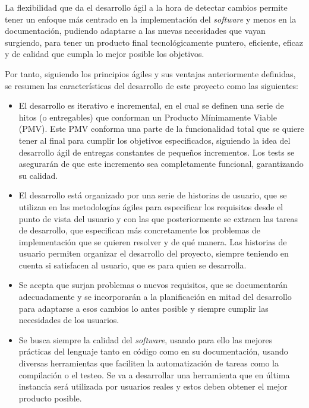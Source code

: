 La flexibilidad que da el desarrollo ágil a la hora de detectar cambios permite
tener un enfoque más centrado en la implementación del \textit{software} y menos
en la documentación, pudiendo adaptarse a las nuevas necesidades que vayan
surgiendo, para tener un producto final tecnológicamente puntero, eficiente,
eficaz y de calidad que cumpla lo mejor posible los objetivos.

Por tanto, siguiendo los principios ágiles y sus ventajas anteriormente
definidas, se resumen las características del desarrollo de este proyecto como
las siguientes:

\begin{itemize}
    \item El desarrollo es iterativo e incremental, en el cual se definen una
    serie de hitos (o entregables) que conforman un Producto Mínimamente Viable
    (PMV). Este PMV conforma una parte de la funcionalidad total que se quiere
    tener al final para cumplir los objetivos especificados, siguiendo la idea
    del desarrollo ágil de entregas constantes de pequeños incrementos. Los
    tests se asegurarán de que este incremento sea completamente funcional,
    garantizando su calidad.
    \item El desarrollo está organizado por una serie de historias de usuario,
    que se utilizan en las metodologías ágiles para especificar los requisitos
    desde el punto de vista del usuario y con las que posteriormente se extraen
    las tareas de desarrollo, que especifican más concretamente los problemas de
    implementación que se quieren resolver y de qué manera. Las historias de
    usuario permiten organizar el desarrollo del proyecto, siempre teniendo en
    cuenta si satisfacen al usuario, que es para quien se desarrolla.
    \item Se acepta que surjan problemas o nuevos requisitos, que se
    documentarán adecuadamente y se incorporarán a la planificación en mitad del
    desarrollo para adaptarse a esos cambios lo antes posible y siempre cumplir
    las necesidades de los usuarios.
    \item Se busca siempre la calidad del \textit{software}, usando para ello
    las mejores prácticas del lenguaje tanto en código como en su documentación,
    usando diversas herramientas que faciliten la automatización de tareas como
    la compilación o el testeo. Se va a desarrollar una herramienta que en
    última instancia será utilizada por usuarios reales y estos deben obtener el
    mejor producto posible.
\end{itemize}

